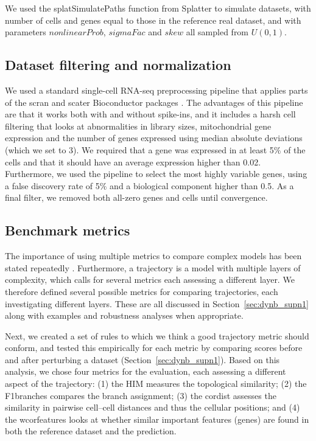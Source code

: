 We used the splatSimulatePaths function from Splatter to simulate datasets, with number of cells and genes equal to those in the reference real dataset, and with parameters  $\textit{nonlinearProb}$, $\textit{sigmaFac}$ and $\textit{skew}$ all sampled from $U(0, 1)$.

\subsection{Dataset filtering and normalization}

We used a standard single-cell RNA-seq preprocessing pipeline that applies parts of the scran and scater Bioconductor packages \cite{lun_stepbystepworkflowlowlevel_2016}. The advantages of this pipeline are that it works both with and without spike-ins, and it includes a harsh cell filtering that looks at abnormalities in library sizes, mitochondrial gene expression and the number of genes expressed using median absolute deviations (which we set to 3). We required that a gene was expressed in at least 5$\%$ of the cells and that it should have an average expression higher than 0.02. Furthermore, we used the pipeline to select the most highly variable genes, using a false discovery rate of 5$\%$ and a biological component higher than 0.5. As a final filter, we removed both all-zero genes and cells until convergence.

\subsection{Benchmark metrics}

The importance of using multiple metrics to compare complex models has been stated repeatedly \cite{norel_selfassessmenttrapcan_2011}. Furthermore, a trajectory is a model with multiple layers of complexity, which calls for several metrics each assessing a different layer. We therefore defined several possible metrics for comparing trajectories, each investigating different layers. These are all discussed in Section~\ref{sec:dynb_supn1} along with examples and robustness analyses when appropriate.

Next, we created a set of rules to which we think a good trajectory metric should conform, and tested this empirically for each metric by comparing scores before and after perturbing a dataset (Section~\ref{sec:dynb_supn1}). Based on this analysis, we chose four metrics for the evaluation, each assessing a different aspect of the trajectory: (1) the HIM measures the topological similarity; (2) the F1branches compares the branch assignment; (3) the cordist assesses the similarity in pairwise cell–cell distances and thus the cellular positions; and (4) the wcorfeatures looks at whether similar important features (genes) are found in both the reference dataset and the prediction.


